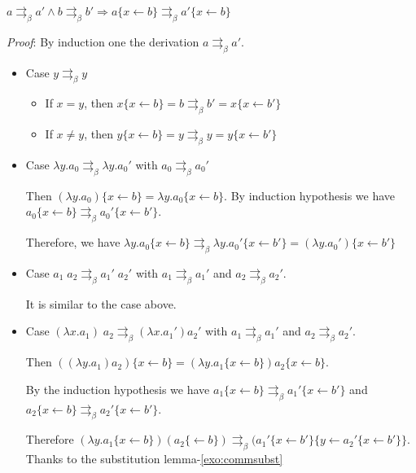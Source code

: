   \lemma  \label{dia_iter}
  $a \rightrightarrows_\beta a' \wedge b \rightrightarrows_\beta b'
  \Rightarrow a\{x \leftarrow b\} \rightrightarrows_\beta a'\{x \leftarrow b\}$

  \textit{Proof}:
  By induction one the derivation $a \rightrightarrows_\beta a'$.

  \begin{itemize}
    \item Case $y \rightrightarrows_\beta y$
      \begin{itemize}
        \item If $x = y$, then $x\{x \leftarrow b\} = b \rightrightarrows_\beta
          b' = x\{x \leftarrow b'\}$

        \item If $x \not = y$, then $y\{x \leftarrow b\} = y
          \rightrightarrows_\beta y = y\{x \leftarrow b'\}$
      \end{itemize}

    \item Case $\lambda y. a_0 \rightrightarrows_\beta \lambda y.a_0'$ with $a_0
      \rightrightarrows_\beta a_0'$

      Then $(\lambda y.a_0)\{x\leftarrow b\} = \lambda y. a_0 \{x \leftarrow
      b\}$. By induction hypothesis we have $a_0\{x \leftarrow b\}
      \rightrightarrows_\beta a_0'\{x \leftarrow b'\}$.

      Therefore, we have $\lambda y.a_0\{x\leftarrow b\} \rightrightarrows_\beta
      \lambda y.a_0'\{x\leftarrow b'\} = (\lambda y.a_0')\{x\leftarrow b'\}$

    \item Case $a_1\; a_2 \rightrightarrows_\beta a_1'\;a_2'$ with $a_1
      \rightrightarrows_\beta a_1'$ and $a_2 \rightrightarrows_\beta a_2'$.

      It is similar to the case above.

    \item Case $(\lambda x. a_1)\;a_2\rightrightarrows_\beta (\lambda x.a_1')
      a_2'$ with $a_1 \rightrightarrows_\beta a_1'$ and $a_2
      \rightrightarrows_\beta a_2'$.

      Then $((\lambda y. a_1)a_2)\{x \leftarrow b\} = (\lambda y. a_1\{x
      \leftarrow b\})a_2\{x \leftarrow b\}$.

      By the induction hypothesis we have $a_1\{x \leftarrow b\}
      \rightrightarrows_\beta a_1'\{x \leftarrow b'\}$ and $a_2\{x \leftarrow
      b\} \rightrightarrows_\beta a_2'\{x \leftarrow b'\}$.

      Therefore $(\lambda y. a_1\{x\leftarrow b\})(a_2\{\leftarrow b\})
      \rightrightarrows_\beta (a_1'\{x \leftarrow b'\}\{y \leftarrow a_2'\{x
      \leftarrow b'\}\}$. Thanks to the substitution lemma-\ref{exo:commsubst}

  \end{itemize}
  \qedsymbol

